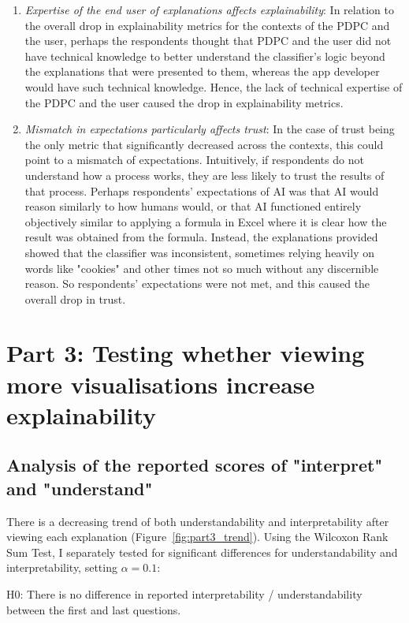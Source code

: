 \begin{enumerate}
    \item \textit{Expertise of the end user of explanations affects explainability}: In relation to the overall drop in explainability metrics for the contexts of the PDPC and the user, perhaps the respondents thought that PDPC and the user did not have technical knowledge to better understand the classifier's logic beyond the explanations that were presented to them, whereas the app developer would have such technical knowledge. Hence, the lack of technical expertise of the PDPC and the user caused the drop in explainability metrics.
    \item \textit{Mismatch in expectations particularly affects trust}: In the case of trust being the only metric that significantly decreased across the contexts, this could point to a mismatch of expectations. Intuitively, if respondents do not understand how a process works, they are less likely to trust the results of that process. Perhaps respondents' expectations of AI was that AI would reason similarly to how humans would, or that AI functioned entirely objectively similar to applying a formula in Excel where it is clear how the result was obtained from the formula. Instead, the explanations provided showed that the classifier was inconsistent, sometimes relying heavily on words like "cookies" and other times not so much without any discernible reason. So respondents' expectations were not met, and this caused the overall drop in trust.
\end{enumerate}

\section{Part 3: Testing whether viewing more visualisations increase explainability}

\subsection{Analysis of the reported scores of "interpret" and "understand"}
\label{sec:interpret_understand}
There is a decreasing trend of both understandability and interpretability after viewing each explanation (Figure~\ref{fig:part3_trend}). Using the Wilcoxon Rank Sum Test, I separately tested for significant differences for understandability and interpretability, setting $\alpha = 0.1$: 

H0: There is no difference in reported interpretability / understandability between the first and last questions.

